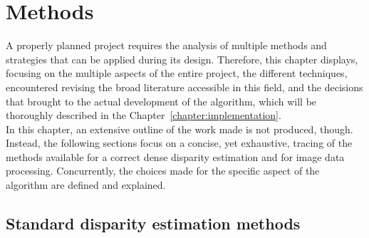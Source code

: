 \chapter{Methods}
\label{chapter:methods}

A properly planned project requires the analysis of multiple methods and strategies that can be applied during its design. 
Therefore, this chapter displays, focusing on the multiple aspects of the entire project, the different techniques, encountered revising the broad literature accessible in this field, and the decisions that brought to the actual development of the algorithm, which will be thoroughly described in the Chapter~\ref{chapter:implementation}.\\
In this chapter, an extensive outline of the work made is not produced, though. 
Instead, the following sections focus on a concise, yet exhaustive, tracing of the methods available for a correct dense disparity estimation and for image data processing.
Concurrently, the choices made for the specific aspect of the algorithm are defined and explained.

\section{Standard disparity estimation methods}
\label{section:std-methods}

